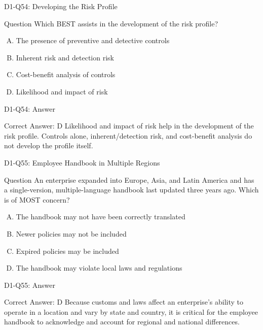 \documentclass{beamer}
\begin{document}
	\begin{frame}{D1-Q54: Developing the Risk Profile}
		\begin{block}{Question}
			Which BEST assists in the development of the risk profile?
		\end{block}
		\begin{enumerate}[(A)]
			\item The presence of preventive and detective controls
			\item Inherent risk and detection risk
			\item Cost-benefit analysis of controls
			\item Likelihood and impact of risk
		\end{enumerate}
	\end{frame}
	\begin{frame}{D1-Q54: Answer}
		\begin{block}{Correct Answer: D}
			Likelihood and impact of risk help in the development of the risk profile. Controls alone, inherent/detection risk, and cost-benefit analysis do not develop the profile itself.
		\end{block}
	\end{frame}
	
	\begin{frame}{D1-Q55: Employee Handbook in Multiple Regions}
		\begin{block}{Question}
			An enterprise expanded into Europe, Asia, and Latin America and has a single-version, multiple-language handbook last updated three years ago. Which is of MOST concern?
		\end{block}
		\begin{enumerate}[(A)]
			\item The handbook may not have been correctly translated
			\item Newer policies may not be included
			\item Expired policies may be included
			\item The handbook may violate local laws and regulations
		\end{enumerate}
	\end{frame}
	\begin{frame}{D1-Q55: Answer}
		\begin{block}{Correct Answer: D}
			Because customs and laws affect an enterprise's ability to operate in a location and vary by state and country, it is critical for the employee handbook to acknowledge and account for regional and national differences.
		\end{block}
	\end{frame}
	
\end{document}
